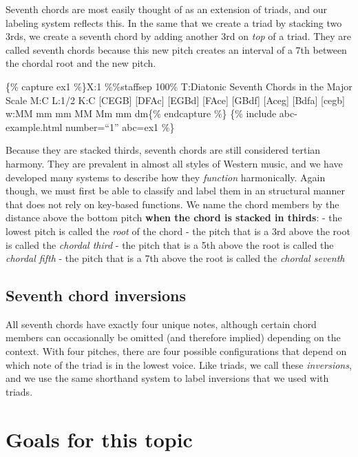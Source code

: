 \documentclass{book}
\begin{document}
Seventh chords are most easily thought of as an extension of triads, and our
labeling system reflects this. In the same that we create a triad by stacking
two 3rds, we create a seventh chord by adding another 3rd on \emph{top} of a
triad. They are called seventh chords because this new pitch creates an
interval of a 7th between the chordal root and the new pitch.

\{\% capture ex1 \%\}X:1 \%\%staffsep 100\% T:Diatonic Seventh Chords in the
Major Scale M:C L:1/2 K:C {[}CEGB{]} {[}DFAc{]}\textbar{} {[}EGBd{]}
{[}FAce{]}\textbar{} {[}GBdf{]} {[}Aceg{]}\textbar{} {[}Bdfa{]}
{[}cegb{]}\textbar\textbar{} w:MM mm mm MM Mm mm dm\{\% endcapture \%\} \{\%
include abc-example.html number=``1'' abc=ex1 \%\}

Because they are stacked thirds, seventh chords are still considered tertian
harmony. They are prevalent in almost all styles of Western music, and we have
developed many systems to describe how they \emph{function} harmonically.
Again though, we must first be able to classify and label them in an
structural manner that does not rely on key-based functions. We name the chord
members by the distance above the bottom pitch \textbf{when the chord is
stacked in thirds}: - the lowest pitch is called the \emph{root} of the chord
- the pitch that is a 3rd above the root is called the \emph{chordal third} -
the pitch that is a 5th above the root is called the \emph{chordal fifth} -
the pitch that is a 7th above the root is called the \emph{chordal seventh}

\hypertarget{seventh-chord-inversions}{%
\subsection{Seventh chord inversions}\label{seventh-chord-inversions}}

All seventh chords have exactly four unique notes, although certain chord
members can occasionally be omitted (and therefore implied) depending on the
context. With four pitches, there are four possible configurations that depend
on which note of the triad is in the lowest voice. Like triads, we call these
\emph{inversions}, and we use the same shorthand system to label inversions
that we used with triads.

\hypertarget{goals-for-this-topic-5}{%
\section{Goals for this topic}\label{goals-for-this-topic-5}}
\end{document}
